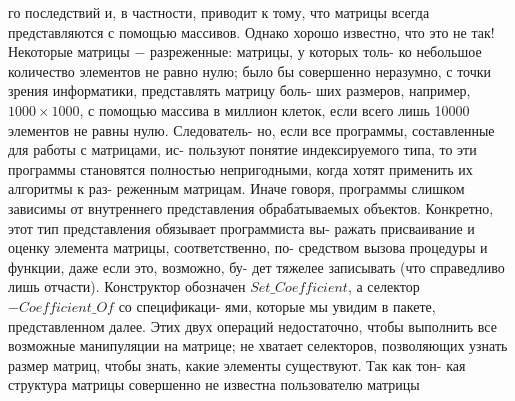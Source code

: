 \noindent
го последствий и, в частности, приводит к тому, что матрицы всегда\linebreak
представляются с помощью массивов. Однако хорошо известно, что это\linebreak
не так! Некоторые матрицы $-$ разреженные: матрицы, у которых толь-\linebreak
ко небольшое количество элементов не равно нулю; было бы совершенно\linebreak
неразумно, с точки зрения информатики, представлять матрицу боль-\linebreak
ших размеров, например, $1000\times 1000$, с помощью массива в миллион\linebreak
клеток, если всего лишь 10000 элементов не равны нулю. Следователь-\linebreak
но,  если  все  программы,  составленные  для  работы  с  матрицами, ис-\linebreak
пользуют понятие индексируемого типа, то эти программы становятся\linebreak
полностью непригодными, когда хотят применить их алгоритмы к раз-\linebreak
реженным матрицам. Иначе говоря, программы слишком зависимы от\linebreak
внутреннего представления обрабатываемых объектов.\newline
\hspace*{15pt}Конкретно, этот тип  представления обязывает программиста вы-\linebreak
ражать присваивание и оценку элемента матрицы, соответственно, по-\linebreak
средством вызова процедуры и функции, даже если это, возможно, бу-\linebreak
дет тяжелее записывать (что справедливо лишь отчасти). Конструктор\linebreak 
обозначен $Set\_Coefficient$, а селектор $- Coefficient\_Of$ со спецификаци-\linebreak
ями, которые мы увидим в пакете, представленном далее.\newline
\hspace*{15pt}Этих двух операций недостаточно, чтобы выполнить все возможные\linebreak
манипуляции на матрице; не хватает селекторов, позволяющих узнать\linebreak
размер матриц, чтобы знать, какие элементы существуют. Так как тон-\linebreak
кая структура матрицы совершенно не известна пользователю матрицы\linebreak
